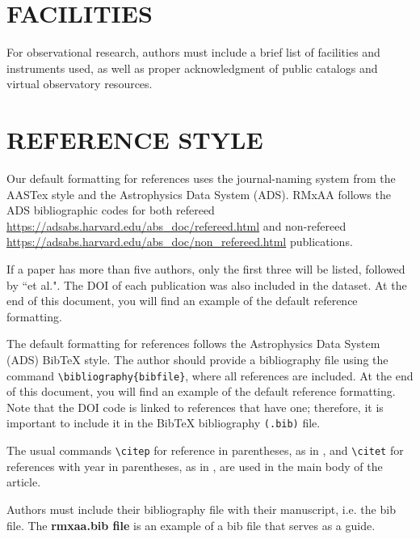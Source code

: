 \documentclass[9pt,article,twoside]{rmaa-rho-class/rmaa-rho}
\newcommand{\CS}[1]{\texttt{\textbackslash #1}}
\begin{document}

\section{FACILITIES}

For observational research, authors must include a brief list of facilities and instruments used, as well as proper acknowledgment of public catalogs and virtual observatory resources.

\section{REFERENCE STYLE}

    Our default formatting for references uses the journal-naming system from the AASTex style and the Astrophysics Data System (ADS). RMxAA follows the ADS bibliographic codes for both refereed \url{https://adsabs.harvard.edu/abs_doc/refereed.html} and non-refereed \url{https://adsabs.harvard.edu/abs_doc/non_refereed.html} publications.
    
    If a paper has more than five authors, only the first three will be listed, followed by ``et al.". The DOI of each publication was also included in the dataset. At the end of this document, you will find an example of the default reference formatting. 

    The default formatting for references follows the Astrophysics Data System (ADS) BibTeX style. The author should provide a bibliography file using the command \CS{bibliography}\verb|{bibfile}|, where all references are included. At the end of this document, you will find an example of the default reference formatting. Note that the DOI code is linked to references that have one; therefore, it is important to include it in the BibTeX bibliography \texttt{(.bib)} file.
    
    The usual commands \CS{citep} for reference in parentheses, as in \citep{Roman23},  and \CS{citet} for references with year in parentheses, as in \citet{Roman23}, are used in the main body of the article.

    Authors must include their bibliography file with their manuscript, i.e. the 
    bib file. The {\bf rmxaa.bib file} is an example of a bib file that serves as a guide.

\renewcommand{\refname}{REFERENCES}


\end{document}
